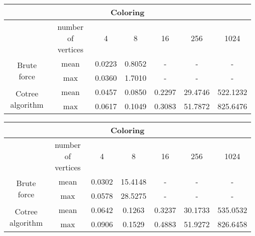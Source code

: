 \begin{center}
    \begin{tabular}{|c|c|c|c|c|c|c|}
        \hline
        \multicolumn{7}{|c|}{Coloring}                                                                         \\
        \hline
                                          & number of vertices & 4      & 8      & 16     & 256     & 1024     \\
        \hline

        \multirow{2}{*}{Brute force}      & mean               & 0.0223 & 0.8052 & -      & -       & -        \\
                                          & max                & 0.0360 & 1.7010 & -      & -       & -        \\
        \hline
        \multirow{2}{*}{Cotree algorithm} & mean               & 0.0457 & 0.0850 & 0.2297 & 29.4746 & 522.1232 \\
                                          & max                & 0.0617 & 0.1049 & 0.3083 & 51.7872 & 825.6476 \\
        \hline
    \end{tabular}
\end{center}

\begin{center}
    \begin{tabular}{|c|c|c|c|c|c|c|}
        \hline
        \multicolumn{7}{|c|}{Coloring}                                                                          \\
        \hline
                                          & number of vertices & 4      & 8       & 16     & 256     & 1024     \\
        \hline

        \multirow{2}{*}{Brute force}      & mean               & 0.0302 & 15.4148 & -      & -       & -        \\
                                          & max                & 0.0578 & 28.5275 & -      & -       & -        \\
        \hline
        \multirow{2}{*}{Cotree algorithm} & mean               & 0.0642 & 0.1263  & 0.3237 & 30.1733 & 535.0532 \\
                                          & max                & 0.0906 & 0.1529  & 0.4883 & 51.9272 & 826.6458 \\
        \hline
    \end{tabular}
\end{center}
